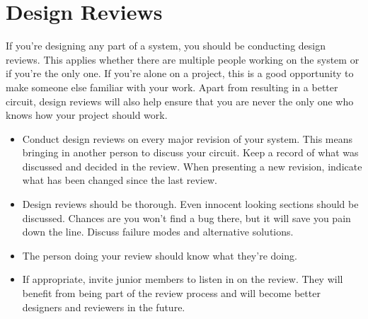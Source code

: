 \documentclass{article}
\begin{document}
\section{Design Reviews}
If you're designing any part of a system, you should be conducting design reviews. This applies whether there are multiple people working on the system or if you're the only one. If you're alone on a project, this is a good opportunity to make someone else familiar with your work. Apart from resulting in a better circuit, design reviews will also help ensure that you are never the only one who knows how your project should work.
\begin{itemize}
\item  Conduct design reviews on every major revision of your system. This means bringing in another person to discuss your circuit. Keep a record of what was discussed and decided in the review. When presenting a new revision, indicate what has been changed since the last review.
\item Design reviews should be thorough. Even innocent looking sections should be discussed. Chances are you won't find a bug there, but it will save you pain down the line. Discuss failure modes and alternative solutions.
\item The person doing your review should know what they're doing.
\item If appropriate, invite junior members to listen in on the review. They will benefit from being part of the review process and will become better designers and reviewers in the future.
\end{itemize}
\end{document}
